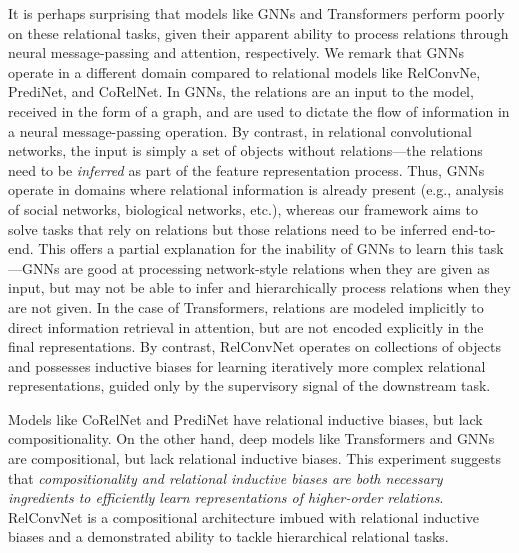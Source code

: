 It is perhaps surprising that models like GNNs and Transformers perform poorly on these relational tasks, given their apparent ability to process relations through neural message-passing and attention, respectively. We remark that GNNs operate in a different domain compared to relational models like RelConvNe, PrediNet, and CoRelNet. In GNNs, the relations are an input to the model, received in the form of a graph, and are used to dictate the flow of information in a neural message-passing operation. By contrast, in relational convolutional networks, the input is simply a set of objects without relations---the relations need to be \textit{inferred} as part of the feature representation process. 
Thus, GNNs operate in domains where relational information is already present (e.g., analysis of social networks, biological networks, etc.), whereas our framework aims to solve tasks that rely on relations but those relations need to be inferred end-to-end. 
This offers a partial explanation for the inability of GNNs to learn this task---GNNs are good at processing network-style relations when they are given as input, but may not be able to infer and hierarchically process relations when they are not given. In the case of Transformers, relations are modeled implicitly to direct information retrieval in attention, but are not encoded explicitly in the final representations. By contrast, RelConvNet operates on collections of objects and possesses inductive biases for learning iteratively more complex relational representations, guided only by the supervisory signal of the downstream task. 

Models like CoRelNet and PrediNet have relational inductive biases, but lack compositionality. On the other hand, deep models like Transformers and GNNs are compositional, but lack relational inductive biases. This experiment suggests that \textit{compositionality and relational inductive biases are both necessary ingredients to efficiently learn representations of higher-order relations}. RelConvNet is a compositional architecture imbued with relational inductive biases and a demonstrated ability to tackle hierarchical relational tasks.
